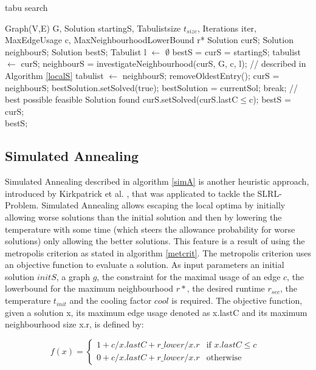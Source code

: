 \documentclass [12pt]{article}
\begin{document}
\begin {algorithm} [H]
\caption {tabu search}
\label {tabusa}
\begin {algorithmic} [3]
\Require Graph(V,E) G, Solution startingS, Tabulistsize $t_{size}$, Iterations iter, MaxEdgeUsage c, MaxNeighbourhoodLowerBound r*
\State Solution curS;
\State Solution neighbourS;
\State Solution bestS;
\State Tabulist l $\gets$ $\emptyset$
\State bestS = curS = startingS;
\State tabulist $\gets$ curS;
\State  neighbourS = investigateNeighbourhood(curS, G, c, l); // described in Algorithm \ref{localS}
\State  tabulist $\gets$ neighbourS;
\State removeOldestEntry();
\EndIf
\State  curS = neighbourS;
\State bestSolution.setSolved(true);
\State bestSolution = currentSol;
\State break; // best possible feasible Solution found
\EndIf
\EndIf  
{}
\State curS.setSolved(curS.lastC$\leq$c);
\State bestS = curS;
\EndIf 
\EndFor\\
\Return bestS;
\end {algorithmic}
\end {algorithm}


\subsection{Simulated Annealing}
Simulated Annealing described in algorithm \ref{simA} is another heuristic approach, introduced by Kirkpatrick et al. \cite{Kirkpatrick83optimizationby}, that
was applicated to tackle the SLRL-Problem. Simulated Annealing allows 
escaping the local optima by initially allowing worse solutions than the initial solution and then by lowering the temperature 
with some time (which steers the allowance probability for worse solutions)
only allowing the better solutions.
This feature is a result of using the metropolis criterion as stated in algorithm \ref{metcrit}. The metropolis criterion uses an objective function to evaluate a solution.
As input parameters an initial solution $initS$, a graph $g$, the constraint for the maximal usage of an edge $c$, the lowerbound for the maximum neighbourhood $r*$,
the desired runtime $r_{sec}$, the temperature $t_{init}$ and the cooling factor $cool$ is required.
The objective function, given a solution x, its maximum edge usage denoted as x.lastC and its maximum neighbourhood size x.r, is defined by:

\begin{equation*}
      f(x) = \begin{cases}
                       1 + c/x.lastC  + r\_lower/x.r             & \text {if $x.lastC \leq c$ }\\
                       0 + c/x.lastC + r\_lower/x.r            & \text{otherwise}
                   \end{cases}
\end{equation*}
\medskip
\end{document}
